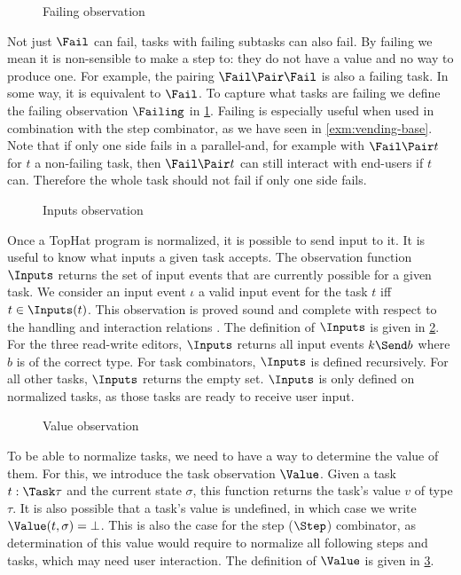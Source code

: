 \begin{figure}
  \caption{Failing observation}
  \label{fig:observation-failing}
\end{figure}

Not just $\Fail$ can fail, tasks with failing subtasks can also fail.
By failing we mean it is non-sensible to make a step to:
they do not have a value and no way to produce one.
For example, the pairing $\Fail \Pair \Fail$ is also a failing task.
In some way, it is equivalent to $\Fail$.
To capture what tasks are failing we define the failing observation $\Failing$ in \cref{fig:observation-failing}.
Failing is especially useful when used in combination with the step combinator,
as we have seen in \cref{exm:vending-base}.
Note that if only one side fails in a parallel-and,
for example with $\Fail \Pair t$ for $t$ a non-failing task,
then $\Fail \Pair t$ can still interact with end-users if $t$ can.
Therefore the whole task should not fail if only one side fails.

\begin{figure}
  \caption{Inputs observation}
  \label{fig:observation-inputs}
\end{figure}

Once a TopHat program is normalized, it is possible to send input to it.
It is useful to know what inputs a given task accepts.
The observation function $\Inputs$ returns the set of input events that are currently possible for a given task.
We consider an input event $\iota$ a valid input event for the task $t$ iff $t \in \Inputs(t)$.
This observation is proved sound and complete with respect to the handling and interaction relations \cite{Steenvoorden22}.
The definition of $\Inputs$ is given in \cref{fig:observation-inputs}.
For the three read-write editors, $\Inputs$ returns all input events $k \Send b$ where $b$ is of the correct type.
For task combinators, $\Inputs$ is defined recursively.
For all other tasks, $\Inputs$ returns the empty set.
$\Inputs$ is only defined on normalized tasks, as those tasks are ready to receive user input.

\begin{figure}
  \caption{Value observation}
  \label{fig:observation-value}
\end{figure}

To be able to normalize tasks, we need to have a way to determine the value of them.
For this, we introduce the task observation $\Value$.
Given a task $t:\Task\tau$ and the current state $\sigma$,
this function returns the task's value $v$ of type $\tau$.
It is also possible that a task's value is undefined, in which case we write $\Value(t,\sigma) = \bot$.
This is also the case for the step ($\Step$) combinator,
as determination of this value would require to normalize all following steps and tasks,
which may need user interaction.
The definition of $\Value$ is given in \cref{fig:observation-value}.
